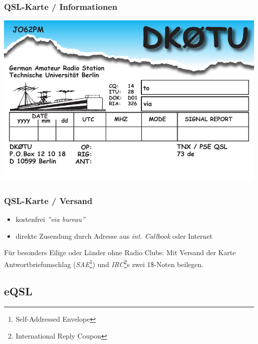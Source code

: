 \begin{frame}
    \frametitle{QSL-Karte / Informationen}

    \begin{center}
        \includegraphics[width=1\textwidth]{bv13/dk0tu_qsl2.pdf}
    \end{center}

\end{frame}

\begin{frame}
    \frametitle{QSL-Karte / Versand}

    \begin{itemize}
        \item kostenfrei \emph{''via bureau''}
        \item direkte Zusendung durch Adresse aus \emph{int. Callbook} oder Internet
    \end{itemize}

    Für besonders Eilige oder Länder ohne Radio Clubs: Mit Versand der Karte
    Antwortbriefumschlag (\emph{SAE}\footnote{Self-Addressed Envelope}) und
    \emph{IRC}\footnote{International Reply Coupon}s zwei 1\$-Noten beilegen. \\[2em]

\end{frame}

\subsection{eQSL}

